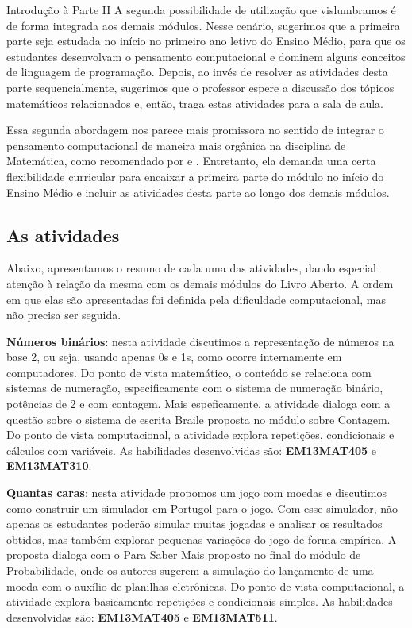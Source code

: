 \begin{apresentacao}{Introdução à Parte II}
A segunda possibilidade de utilização que vislumbramos é de forma integrada aos demais módulos. Nesse cenário, sugerimos que a primeira parte seja estudada no início no primeiro ano letivo do Ensino Médio, para que os estudantes desenvolvam o pensamento computacional e dominem alguns conceitos de linguagem de programação. Depois, ao invés de resolver as atividades desta parte sequencialmente, sugerimos que o professor espere a discussão dos tópicos matemáticos relacionados e, então, traga estas atividades para a sala de aula.

Essa segunda abordagem nos parece mais promissora no sentido de integrar o pensamento computacional de maneira mais orgânica na disciplina de Matemática, como recomendado por \citet{disessa2018} e \citet{li2020}. Entretanto, ela demanda uma certa flexibilidade curricular para encaixar a primeira parte do módulo no início do Ensino Médio e incluir as atividades desta parte ao longo dos demais módulos.

\subsection{As atividades}
Abaixo, apresentamos o resumo de cada uma das atividades, dando especial atenção à relação da mesma com os demais módulos do Livro Aberto. A ordem em que elas são apresentadas foi definida pela dificuldade computacional, mas não precisa ser seguida.

\textbf{Números binários}: nesta atividade discutimos a representação de números na base 2, ou seja, usando apenas 0s e 1s, como ocorre internamente em computadores. Do ponto de vista matemático, o conteúdo se relaciona com sistemas de numeração, especificamente com o sistema de numeração binário, potências de 2 e com contagem. Mais espeficamente, a atividade dialoga com a questão sobre o sistema de escrita Braile proposta no módulo sobre Contagem. Do ponto de vista computacional, a atividade explora repetições, condicionais e cálculos com variáveis. As habilidades desenvolvidas são: \textbf{EM13MAT405} e \textbf{EM13MAT310}.

\textbf{Quantas caras}: nesta atividade propomos um jogo com moedas e discutimos como construir um simulador em Portugol para o jogo. Com esse simulador, não apenas os estudantes poderão simular muitas jogadas e analisar os resultados obtidos, mas também explorar pequenas variações do jogo de forma empírica. A proposta dialoga com o Para Saber Mais proposto no final do módulo de Probabilidade, onde os autores sugerem a simulação do lançamento de uma moeda com o auxílio de planilhas eletrônicas. Do ponto de vista computacional, a atividade explora basicamente repetições e condicionais simples. As habilidades desenvolvidas são: \textbf{EM13MAT405} e \textbf{EM13MAT511}.


\end{apresentacao}
